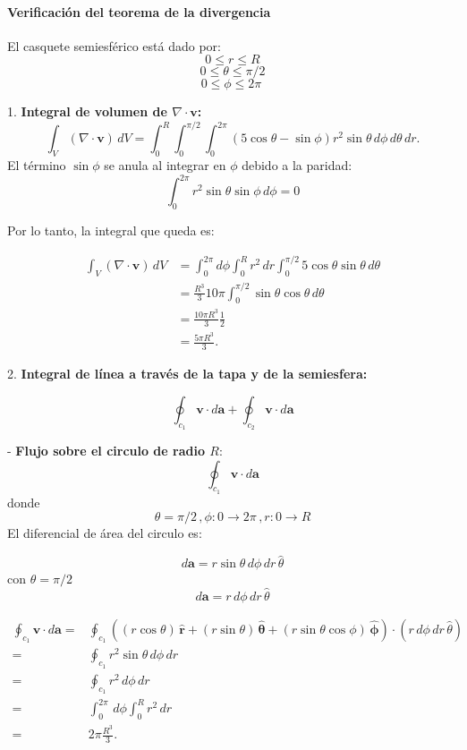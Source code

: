 \documentclass[12pt]{article}
\begin{document}
\paragraph*{Verificación del teorema de la divergencia} 

El casquete semiesférico está dado por:
\[0 \leq r \leq R\] \[0 \leq \theta \leq \pi/2\] \[0 \leq \phi \leq 2\pi\ \]   

1. \textbf{Integral de volumen de \(\nabla \cdot \mathbf{v}\):}  
\[
\int_V (\nabla \cdot \mathbf{v}) \, dV = \int_0^R \int_{0}^{\pi/2} \int_0^{2\pi} \left( 5\cos\theta - \sin\phi \right) r^2 \sin\theta \, d\phi \, d\theta \, dr.
\]  
El término \(\sin\phi\) se anula al integrar en \(\phi\) debido a la paridad:  
\[ \int_{0}^{2\pi} r^2\sin\theta\sin\phi \, d\phi = 0\]

Por lo tanto, la integral que queda es:

\begin{align*}
    \int_V (\nabla \cdot \mathbf{v}) \, dV & = \int_{0}^{2\pi} d\phi \int_0^R r^2 \, dr \int_{0}^{\pi/2} 5\cos\theta \sin\theta \, d\theta\\
& = \frac{R^3}{3} 10\pi \int_{0}^{\pi/2} \sin\theta\cos\theta \,d\theta    \\    
& = \frac{10\pi R^3}{3}\frac{1}{2} \\    
& = \frac{5\pi R^3}{3}.
\end{align*}

2. \textbf{Integral de línea a través de la tapa y de la semiesfera:} 
 
\[
\oint_{c_1} \mathbf{v} \cdot d\mathbf{a} + \oint_{c_2}\mathbf{v} \cdot d\mathbf{a} 
\]  

- \textbf{Flujo sobre el circulo de radio \(R\)}:
\[\oint_{c_1} \mathbf{v} \cdot d\mathbf{a}\]
donde 
\[\theta = \pi/2 \,, \phi:0 \rightarrow 2\pi \,, r:0 \rightarrow R\]
El diferencial de área del circulo es: 

\[d\mathbf{a} = r\sin\theta \, d\phi \, dr\, \hat{\theta }\] con \(\theta = \pi/2\) 
\[d\mathbf{a} = r \, d\phi \, dr\, \hat{\theta }\]

\begin{align*}
\oint_{c_1 } \mathbf{v} \cdot d \mathbf{a}  = & \oint_{c_1} ((r\cos\theta)\,\hat{\mathbf{r}} + (r\sin\theta)\,\hat{\boldsymbol{\theta}} + (r\sin\theta\cos\phi)\,\hat{\boldsymbol{\phi}})\cdot(r \, d\phi \, dr\, \hat{\theta }) \\
 = & \oint_{c_1} r^2\sin\theta \, d\phi \, dr \\
 = & \oint_{c_1} r^2 \, d\phi \, dr \\
 = & \int_{0}^{2\pi} \, d\phi \int_{0}^{R} r^2 \, dr \\
 = & \boxed{2\pi \frac{R^3}{3}} .
\end{align*}
\end{document}
